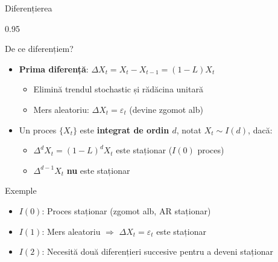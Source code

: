 \documentclass[9pt, aspectratio=169, t]{beamer}
\begin{document}
\begin{frame}{Diferențierea}
    \vspace{-0.1cm}
    \begin{cminipage}{0.95\textwidth}
        \vspace{-0.3cm}
        {\small
        \begin{block}{De ce diferențiem?}
            \begin{itemize}\setlength{\itemsep}{0pt}
                \item \textbf{Prima diferență}: $\Delta X_t = X_t - X_{t-1} = (1 - L)X_t$
                \begin{itemize}
                    \item Elimină trendul stochastic și rădăcina unitară
                    \item Mers aleatoriu: $\Delta X_t = \varepsilon_t$ (devine zgomot alb)
                \end{itemize}
            \end{itemize}
        \end{block}

        \begin{defn}
            \begin{itemize}\setlength{\itemsep}{0pt}
                \item Un proces $\{X_t\}$ este \textbf{integrat de ordin $d$}, notat $X_t \sim I(d)$, dacă:
                \begin{itemize}\setlength{\itemsep}{0pt}
                    \item $\Delta^d X_t = (1-L)^d X_t$ este staționar ($I(0)$ proces)
                    \item $\Delta^{d-1} X_t$ \textbf{nu} este staționar
                \end{itemize}
            \end{itemize}
        \end{defn}

        \begin{exampleblock}{Exemple}
            \begin{itemize}\setlength{\itemsep}{0pt}
                \item $I(0)$: Proces staționar (zgomot alb, AR staționar)
                \item $I(1)$: Mers aleatoriu $\Rightarrow$ $\Delta X_t = \varepsilon_t$ este staționar
                \item $I(2)$: Necesită două diferențieri succesive pentru a deveni staționar
            \end{itemize}
        \end{exampleblock}
        }
    \end{cminipage}
\end{frame}
\end{document}
